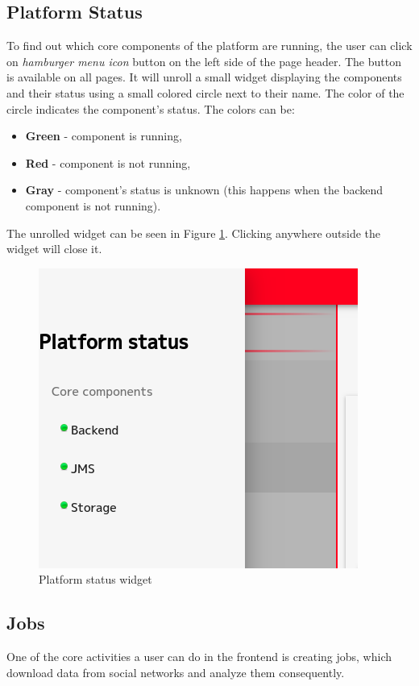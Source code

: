 \documentclass{article}
\begin{document}
\subsection{Platform Status}
To find out which core components of the platform are running, the user can click on \textit{hamburger menu icon} button on the left side of the page header. The button is available on all pages. It will unroll a small widget displaying the components and their status using a small colored circle next to their name. The color of the circle indicates the component's status. The colors can be:
\begin{itemize}
    \item \textbf{Green} - component is running,
    \item \textbf{Red} - component is not running,
    \item \textbf{Gray} - component's status is unknown (this happens when the backend component is not running).
\end{itemize}

The unrolled widget can be seen in Figure \ref{figure:platform-status}. Clicking anywhere outside the widget will close it.

\begin{figure}[h]
\includegraphics[scale=2.0]{images/platform_status.png}
\centering
\caption{Platform status widget}
\label{figure:platform-status}
\end{figure}

\subsection{Jobs}
One of the core activities a user can do in the frontend is creating jobs, which download data from social networks and analyze them consequently. 
\end{document}
